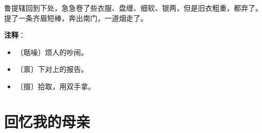 \documentclass[12pt,UTF-8,openany]{ctexbook}
\begin{document}
\begin{normalsize}
    鲁提辖回到下处，急急卷了些衣服、盘缠、细软、银两，但是旧衣粗重，都弃了。提了一条齐眉短棒，奔出南门，一道烟走了。
    
\end{normalsize}


\newpage

\textbf{注释}：

\vspace{-1em}

\begin{itemize}
    \setlength\itemsep{-0.2em}
    \item 〔聒噪〕烦人的吵闹。
    \item 〔禀〕下对上的报告。
    \item 〔掇〕拾取，用双手拿。
\end{itemize}

\chapter{回忆我的母亲}
\end{document}
